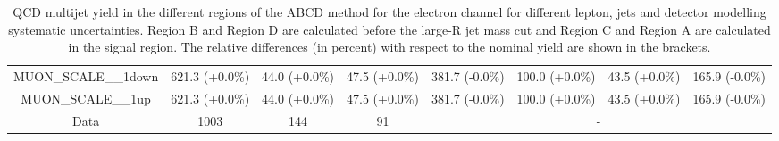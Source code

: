 \begin{table}[htbp!]
\begin{tiny}
\begin{center}
\begin{tabular}{c|c|c|c||c|c|c|c}
MUON\_SCALE\_\_1down                                         & 621.3     (+0.0\%) & 44.0      (+0.0\%) & 47.5      (+0.0\%) & 381.7     (-0.0\%) & 100.0     (+0.0\%) & 43.5      (+0.0\%) & 165.9     (-0.0\%) \\ 
MUON\_SCALE\_\_1up                                           & 621.3     (+0.0\%) & 44.0      (+0.0\%) & 47.5      (+0.0\%) & 381.7     (-0.0\%) & 100.0     (+0.0\%) & 43.5      (+0.0\%) & 165.9     (-0.0\%) \\ 
\hline 
\hline 
Data                                                        & 1003  & 144   & 91  &\multicolumn{4}{c}{-} \\ 
\hline
\end{tabular}
\end{center}
\caption{QCD multijet yield in the different regions of the ABCD method for the electron channel for 
different lepton, jets and \met detector modelling systematic uncertainties. Region B and Region D are calculated before the large-R jet mass cut 
and Region C and Region A are calculated in the signal region. The relative differences (in percent) with respect to the nominal yield are shown in the 
brackets.} 
\label{tab:boosted_qcd_detsyst_elec_sr_1}
\end{tiny}
\end{table} 
%
%
